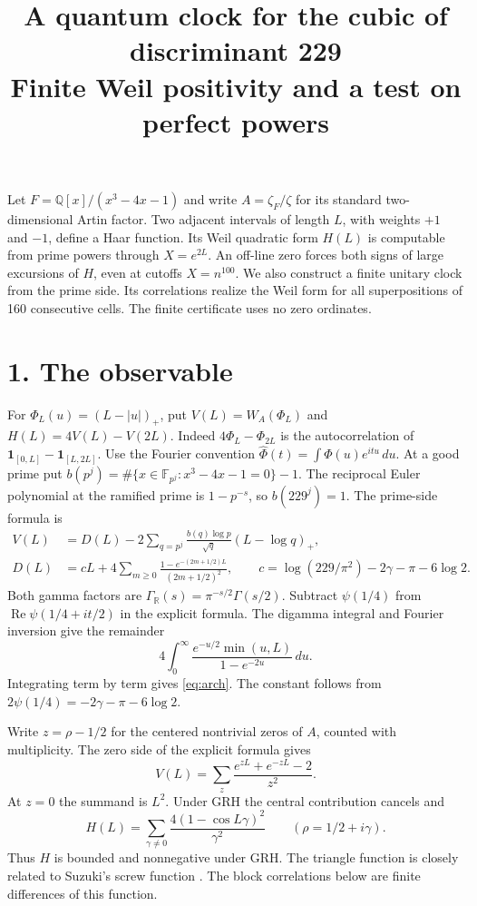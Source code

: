 \documentclass[11pt]{article}
\title{A quantum clock for the cubic of discriminant 229\\
\large Finite Weil positivity and a test on perfect powers}
\author{}\date{}
\newcommand{\Rea}{\operatorname{Re}}
\begin{document}
\maketitle
\vspace{-2.6em}
Let $F=\mathbb Q[x]/(x^3-4x-1)$ and write $A=\zeta_F/\zeta$ for its standard
two-dimensional Artin factor. Two adjacent intervals of length $L$, with weights
$+1$ and $-1$, define a Haar function. Its Weil quadratic form $H(L)$ is
computable from prime powers through $X=e^{2L}$. An off-line zero forces
both signs of large excursions of $H$, even at cutoffs $X=n^{100}$.
We also construct a finite unitary clock from the prime side. Its correlations
realize the Weil form for all superpositions of 160 consecutive cells.
The finite certificate uses no zero ordinates.

\section*{1. The observable}
For $\Phi_L(u)=(L-|u|)_+$, put $V(L)=W_A(\Phi_L)$ and
$H(L)=4V(L)-V(2L)$. Indeed $4\Phi_L-\Phi_{2L}$ is the autocorrelation
of $\mathbf1_{[0,L]}-\mathbf1_{[L,2L]}$. Use the Fourier convention
$\widehat\Phi(t)=\int\Phi(u)e^{itu}\,du$. At a good prime put
$b(p^j)=\#\{x\in\mathbb F_{p^j}:x^3-4x-1=0\}-1$.
The reciprocal Euler polynomial at the ramified prime is $1-p^{-s}$,
so $b(229^j)=1$. The prime-side formula is
\begin{align}
 V(L)&=D(L)-2\sum_{q=p^j}\frac{b(q)\log p}{\sqrt q}(L-\log q)_+,\label{eq:prime}\\
 D(L)&=cL+4\sum_{m\ge0}\frac{1-e^{-(2m+1/2)L}}{(2m+1/2)^2},\qquad
 c=\log(229/\pi^2)-2\gamma-\pi-6\log2. \label{eq:arch}
\end{align}
Both gamma factors are $\Gamma_{\mathbb R}(s)=\pi^{-s/2}\Gamma(s/2)$.
Subtract $\psi(1/4)$ from $\Rea\psi(1/4+it/2)$ in the explicit formula.
The digamma integral and Fourier inversion give the remainder
\[
 4\int_0^\infty \frac{e^{-u/2}\min(u,L)}{1-e^{-2u}}\,du.
\]
Integrating term by term gives \eqref{eq:arch}. The constant follows from
$2\psi(1/4)=-2\gamma-\pi-6\log 2$.

Write $z=\rho-1/2$ for the centered nontrivial zeros of $A$, counted with
multiplicity. The zero side of the explicit formula gives
\[
 V(L)=\sum_z\frac{e^{zL}+e^{-zL}-2}{z^2}.
\]
At $z=0$ the summand is $L^2$. Under GRH the central contribution cancels and
\[
 H(L)=\sum_{\gamma\ne0}\frac{4(1-\cos L\gamma)^2}{\gamma^2}
 \qquad(\rho=1/2+i\gamma).
\]
Thus $H$ is bounded and nonnegative under GRH. The triangle function is
closely related to Suzuki's screw function \cite{suzuki,form}. The block
correlations below are finite differences of this function.
\end{document}
